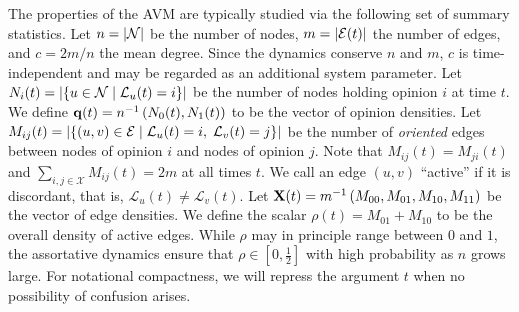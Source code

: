 \documentclass[review, onefignum, onetabnum]{siamart171218}
\begin{document}
	The properties of the AVM are typically studied via the following set of summary statistics. 
	Let $n = \left|\mathcal{N}\right|$ be the number of nodes, $m = \left|\mathcal{E}(t)\right|$ the number of edges, and $c = {2m}/{n}$ the mean degree.
	Since the dynamics conserve $n$ and $m$, $c$ is time-independent and may be regarded as an additional system parameter. 
	Let $N_i(t) = \left|\{u \in \mathcal{N} \;|\;\mathcal{L}_u(t) = i \}\right|$ be the number of nodes holding opinion $i$ at time $t$. 
	We define $\mathbf{q}(t) = n^{-1}\left(N_0(t), N_1(t)\right)$ to be the vector of opinion densities.
	Let $M_{ij}(t) = \left|\{(u,v) \in \mathcal{E} \;|\; \mathcal{L}_u(t) = i,\; \mathcal{L}_v(t) = j \}\right|$ be the number of \emph{oriented} edges between nodes of opinion $i$ and nodes of opinion $j$. 
	Note that $M_{ij}(t) = M_{ji}(t)$ and $\sum_{i,j \in \mathcal{X}} M_{ij}(t) = 2m$ at all times $t$.
	We call an edge $(u,v)$ ``active'' if it is discordant, that is, $\mathcal{L}_u(t) \neq \mathcal{L}_v(t)$. 
	Let $\mathbf{X}(t) = m^{-1}\left(M_{00}, M_{01}, M_{10}, M_{11}\right)$ be the vector of edge densities. 
	We define the scalar $\rho(t) = M_{01} + M_{10}$ to be the overall density of active edges. 
	While $\rho$ may in principle range between $0$ and $1$, the assortative dynamics ensure that $\rho \in [0,\frac{1}{2}]$ with high probability as $n$ grows large. 
	For notational compactness, we will repress the argument $t$ when no possibility of confusion arises.
\end{document}
